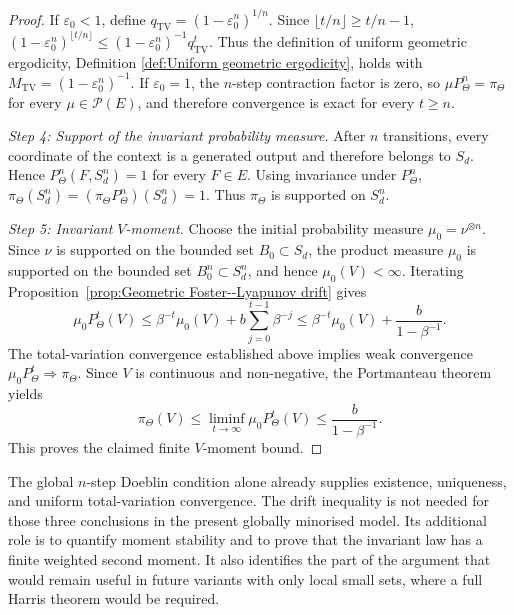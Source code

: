 \begin{proof}
If \(\varepsilon_0<1\), define \(q_{\mathrm{TV}}=(1-\varepsilon_0^n)^{1/n}\). Since \(\lfloor t/n\rfloor\geqslant t/n-1\),
\(
(1-\varepsilon_0^n)^{\lfloor t/n\rfloor}
\leqslant
(1-\varepsilon_0^n)^{-1}q_{\mathrm{TV}}^t.
\)
Thus the definition of uniform geometric ergodicity, Definition \ref{def:Uniform geometric ergodicity}, holds with \(M_{\mathrm{TV}}=(1-\varepsilon_0^n)^{-1}\). If \(\varepsilon_0=1\), the \(n\)-step contraction factor is zero, so \(\mu P_\Theta^n=\pi_\Theta\) for every \(\mu\in\mathcal P(E)\), and therefore convergence is exact for every \(t\geqslant n\).

\textit{Step 4: Support of the invariant probability measure.}
After \(n\) transitions, every coordinate of the context is a generated output and therefore belongs to \(S_d\). Hence \(P_\Theta^n(F,S_d^n)=1\) for every \(F\in E\). Using invariance under \(P_\Theta^n\),
\(
\pi_\Theta(S_d^n)
=
(\pi_\Theta P_\Theta^n)(S_d^n)
=
1.
\)
Thus \(\pi_\Theta\) is supported on \(S_d^n\).

\textit{Step 5: Invariant \(V\)-moment.}
Choose the initial probability measure \(\mu_0=\nu^{\otimes n}\). Since \(\nu\) is supported on the bounded set \(B_0\subset S_d\), the product measure \(\mu_0\) is supported on the bounded set \(B_0^n\subset S_d^n\), and hence \(\mu_0(V)<\infty\). Iterating Proposition~\ref{prop:Geometric Foster--Lyapunov drift} gives
\[
\mu_0P_\Theta^t(V)
\leqslant
\beta^{-t}\mu_0(V)
+
b\sum_{j=0}^{t-1}\beta^{-j}
\leqslant
\beta^{-t}\mu_0(V)
+
\frac{b}{1-\beta^{-1}}.
\]
The total-variation convergence established above implies weak convergence \(\mu_0P_\Theta^t\Rightarrow\pi_\Theta\). Since \(V\) is continuous and non-negative, the Portmanteau theorem yields
\[
\pi_\Theta(V)
\leqslant
\liminf_{t\to\infty}\mu_0P_\Theta^t(V)
\leqslant
\frac{b}{1-\beta^{-1}}.
\]
This proves the claimed finite \(V\)-moment bound.
\end{proof}

\begin{remark}\label{rem:Roles of Doeblin minorisation and drift}
The global \(n\)-step Doeblin condition alone already supplies existence, uniqueness, and uniform total-variation convergence. The drift inequality is not needed for those three conclusions in the present globally minorised model. Its additional role is to quantify moment stability and to prove that the invariant law has a finite weighted second moment. It also identifies the part of the argument that would remain useful in future variants with only local small sets, where a full Harris theorem would be required.
\end{remark}

